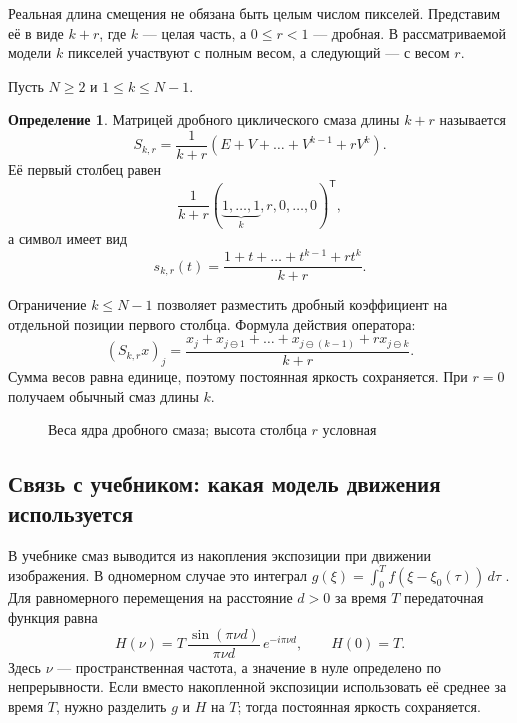 \documentclass[12pt,a4paper]{article}
\theoremstyle{definition}
\newtheorem{definition}{Определение}
\theoremstyle{remark}
\begin{document}
Реальная длина смещения не обязана быть целым числом пикселей.
Представим её в виде $k+r$, где $k$ --- целая часть, а
$0\leqslant r<1$ --- дробная. В рассматриваемой модели $k$ пикселей
участвуют с полным весом, а следующий --- с весом $r$.

Пусть $N\geqslant2$ и $1\leqslant k\leqslant N-1$.

\begin{definition}
Матрицей дробного циклического смаза длины $k+r$ называется
\[
  S_{k,r}=\frac1{k+r}(E+V+\dots+V^{k-1}+rV^k).
\]
Её первый столбец равен
\[
  \frac1{k+r}
  (\underbrace{1,\dots,1}_{k},r,0,\dots,0)^{\mathsf T},
\]
а символ имеет вид
\[
  s_{k,r}(t)=\frac{1+t+\dots+t^{k-1}+rt^k}{k+r}.
\]
\end{definition}

Ограничение $k\leqslant N-1$ позволяет разместить дробный коэффициент
на отдельной позиции первого столбца. Формула действия оператора:
\[
  (S_{k,r}x)_j=\frac{x_j+x_{j\ominus1}+\dots+x_{j\ominus(k-1)}
                            +r x_{j\ominus k}}{k+r}.
\]
Сумма весов равна единице, поэтому постоянная яркость сохраняется.
При $r=0$ получаем обычный смаз длины $k$.

\begin{figure}[ht]
  \centering
  \caption{Веса ядра дробного смаза; высота столбца $r$ условная}
\end{figure}

\subsection{Связь с учебником: какая модель движения используется}

В учебнике смаз выводится из накопления экспозиции при движении
изображения. В одномерном случае это интеграл
$g(\xi)=\int_0^T f(\xi-\xi_0(\tau))\,d\tau$
\cite[\S\,5.6.3, с.~410--411]{GW2012}.
Для равномерного перемещения на расстояние $d>0$ за время $T$
передаточная функция равна
\[
  H(\nu)=T\,\frac{\sin(\pi\nu d)}{\pi\nu d}\,e^{-i\pi\nu d},
  \qquad H(0)=T.
\]
Здесь $\nu$ --- пространственная частота, а значение в нуле
определено по непрерывности. Если вместо накопленной экспозиции
использовать её среднее за время $T$, нужно разделить $g$ и $H$
на $T$; тогда постоянная яркость сохраняется.
\end{document}
